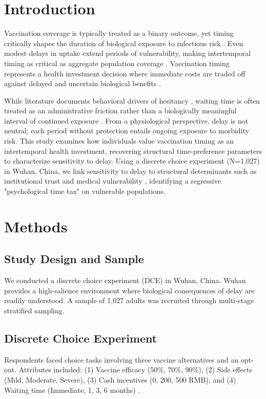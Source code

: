 \documentclass[preprint,12pt,authoryear]{elsarticle}
\begin{document}
\doublespacing
\linenumbers

\section{Introduction}
Vaccination coverage is typically treated as a binary outcome, yet timing critically shapes the duration of biological exposure to infectious risk \citep{Castioni2024, Shankar2024}. Even modest delays in uptake extend periods of vulnerability, making intertemporal timing as critical as aggregate population coverage \citep{Rasmussen2021}. Vaccination timing represents a health investment decision where immediate costs are traded off against delayed and uncertain biological benefits \citep{Frederick2002}.

While literature documents behavioral drivers of hesitancy \citep{Anderson2023, Robertson2024, Etowa2024}, waiting time is often treated as an administrative friction rather than a biologically meaningful interval of continued exposure \citep{Lievre2024, Tran2025, Whitaker2026}. From a physiological perspective, delay is not neutral; each period without protection entails ongoing exposure to morbidity risk. This study examines how individuals value vaccination timing as an intertemporal health investment, recovering structural time-preference parameters to characterize sensitivity to delay. Using a discrete choice experiment (N=1,027) in Wuhan, China, we link sensitivity to delay to structural determinants such as institutional trust and medical vulnerability \citep{Krastev2023, Bok2024, Kumar2025}, identifying a regressive "psychological time tax" on vulnerable populations.

\section{Methods}
\subsection{Study Design and Sample}
We conducted a discrete choice experiment (DCE) in Wuhan, China. Wuhan provides a high-salience environment where biological consequences of delay are readily understood. A sample of 1,027 adults was recruited through multi-stage stratified sampling.

\subsection{Discrete Choice Experiment}
Respondents faced choice tasks involving three vaccine alternatives and an opt-out. Attributes included: (1) Vaccine efficacy (50\%, 70\%, 90\%), (2) Side effects (Mild, Moderate, Severe), (3) Cash incentives (0, 200, 500 RMB), and (4) Waiting time (Immediate, 1, 3, 6 months) \citep{Yue2021, Gong2020}. 
\end{document}
